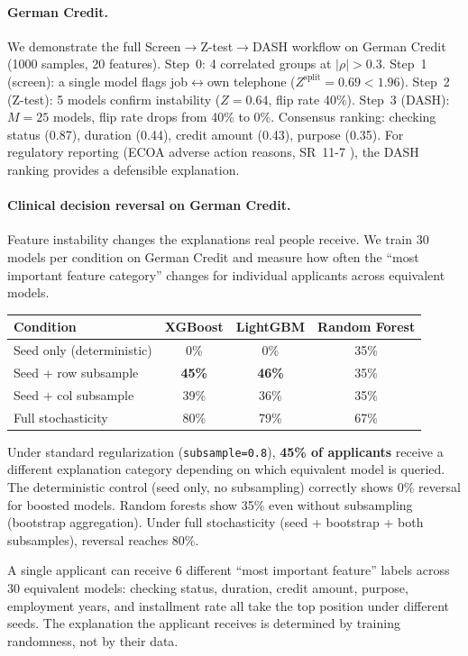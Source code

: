 \documentclass{article}
\begin{document}
\paragraph{German Credit.}
We demonstrate the full Screen$\to$Z-test$\to$DASH workflow on German Credit (1000 samples, 20 features). Step~0: 4 correlated groups at $|\rho| > 0.3$. Step~1 (screen): a single model flags job$\leftrightarrow$own telephone ($Z^{\text{split}} = 0.69 < 1.96$). Step~2 (Z-test): 5 models confirm instability ($Z = 0.64$, flip rate 40\%). Step~3 (DASH): $M = 25$ models, flip rate drops from 40\% to 0\%. Consensus ranking: checking status (0.87), duration (0.44), credit amount (0.43), purpose (0.35). For regulatory reporting (ECOA adverse action reasons, SR~11-7 \citep{occ2011sr117}), the DASH ranking provides a defensible explanation.

\paragraph{Clinical decision reversal on German Credit.}
Feature instability changes the explanations real people receive. We train 30 models per condition on German Credit and measure how often the ``most important feature category'' changes for individual applicants across equivalent models.

\begin{center}
\small
\begin{tabular}{@{}lccc@{}}
\toprule
Condition & XGBoost & LightGBM & Random Forest \\
\midrule
Seed only (deterministic) & 0\% & 0\% & 35\% \\
Seed + row subsample & \textbf{45\%} & \textbf{46\%} & 35\% \\
Seed + col subsample & 39\% & 36\% & 35\% \\
Full stochasticity & 80\% & 79\% & 67\% \\
\bottomrule
\end{tabular}
\end{center}

Under standard regularization (\texttt{subsample=0.8}), \textbf{45\% of applicants} receive a different explanation category depending on which equivalent model is queried. The deterministic control (seed only, no subsampling) correctly shows 0\% reversal for boosted models. Random forests show 35\% even without subsampling (bootstrap aggregation). Under full stochasticity (seed + bootstrap + both subsamples), reversal reaches 80\%.

A single applicant can receive 6 different ``most important feature'' labels across 30 equivalent models: checking status, duration, credit amount, purpose, employment years, and installment rate all take the top position under different seeds. The explanation the applicant receives is determined by training randomness, not by their data.
\end{document}
